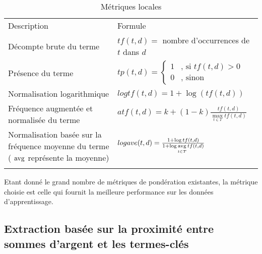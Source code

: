 \begin{table}[!htb]
	\scriptsize\centering
	\begin{tabular}{p{}@{\hskip 0.2in}p{}}
		\hline\noalign{\smallskip}
		Description & Formule \\
		\noalign{\smallskip}
		\hline
		\noalign{\smallskip}
		Décompte brute du terme \citep{salton1988term-weighting}  & $tf(t,d) = $ nombre d'occurrences de $t$ dans $d$\\  \noalign{\smallskip}
		Présence du terme \citep{salton1988term-weighting} & $tp(t,d) = \left\lbrace \begin{array}{cl}
		1 & \text{, si } tf(t,d) > 0 \\
		0 & \text{, sinon}
		\end{array} \right.$ \\ \noalign{\smallskip}
		Normalisation logarithmique  & $logtf(t,d) = 1 + \log{\left(tf(t,d)\right)}$  \\ \noalign{\smallskip}
		Fréquence augmentée et normalisée du terme \citep{salton1988term-weighting}%
		& $atf(t,d) = k + (1-k) \frac{tf(t,d)}{\max\limits_{t \in T} tf(t,d)}$  \\ \noalign{\smallskip}
		Normalisation basée sur la fréquence moyenne du terme  \citep{manning2008irbook-weighting} (	$\mathop{\mathrm{avg}}\limits $ représente la moyenne) & $logave(t,d) = \frac{1+\log {tf(t,d)}}{1 + \log \mathop{\mathrm{avg}}\limits\limits_{t \in T} tf(t, d) }$  \\ \noalign{\smallskip} 
		\hline
	\end{tabular}

	\caption{Métriques locales}\label{quanta:tab:metriq_locales}
\end{table}

Etant donné le grand nombre de métriques de pondération existantes, la métrique choisie est celle qui fournit la meilleure performance sur les données d'apprentissage.

\subsection{Extraction basée sur la proximité entre sommes d'argent et les termes-clés}
\label{sec:quanta:extraction}

